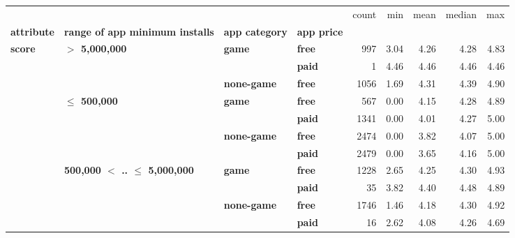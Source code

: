 \begin{tabular}{llll|rrrrr}
\toprule
      &                                 &           &      &  count &          min &         mean &       median &           max \\
\textbf{attribute} & \textbf{range of app minimum installs} & \textbf{app category} & \textbf{app price} &        &              &              &              &               \\
\midrule
\multirow{11}{*}{\textbf{score}} & \multirow{3}{*}{\textbf{$>$ 5,000,000}} & \multirow{2}{*}{\textbf{game}} & \textbf{free} &    997 &         3.04 &         4.26 &         4.28 &          4.83 \\
      &                                 &           & \textbf{paid} &      1 &         4.46 &         4.46 &         4.46 &          4.46 \\
\cline{3-9}
      &                                 & \textbf{none-game} & \textbf{free} &   1056 &         1.69 &         4.31 &         4.39 &          4.90 \\
\cline{2-9}
      & \multirow{4}{*}{\textbf{$\leq$ 500,000}} & \multirow{2}{*}{\textbf{game}} & \textbf{free} &    567 &         0.00 &         4.15 &         4.28 &          4.89 \\
      &                                 &           & \textbf{paid} &   1341 &         0.00 &         4.01 &         4.27 &          5.00 \\
\cline{3-9}
      &                                 & \multirow{2}{*}{\textbf{none-game}} & \textbf{free} &   2474 &         0.00 &         3.82 &         4.07 &          5.00 \\
      &                                 &           & \textbf{paid} &   2479 &         0.00 &         3.65 &         4.16 &          5.00 \\
\cline{2-9}
\cline{3-9}
      & \multirow{4}{*}{\textbf{500,000 $<$ .. $\leq$ 5,000,000}} & \multirow{2}{*}{\textbf{game}} & \textbf{free} &   1228 &         2.65 &         4.25 &         4.30 &          4.93 \\
      &                                 &           & \textbf{paid} &     35 &         3.82 &         4.40 &         4.48 &          4.89 \\
\cline{3-9}
      &                                 & \multirow{2}{*}{\textbf{none-game}} & \textbf{free} &   1746 &         1.46 &         4.18 &         4.30 &          4.92 \\
      &                                 &           & \textbf{paid} &     16 &         2.62 &         4.08 &         4.26 &          4.69 \\

\end{tabular}
